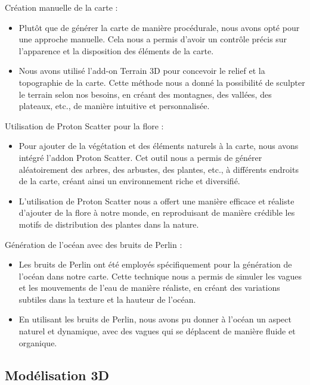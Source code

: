 \documentclass[
	article,			%
	11pt,				%
	oneside,			%
	a4paper,			%
	chapter=TITLE,
	french,			%
	sumario=tradicional
	]{base_nt}
\begin{document}
Création manuelle de la carte :

\begin{itemize}
    \item Plutôt que de générer la carte de manière procédurale, nous avons opté pour une approche manuelle. Cela nous a permis d'avoir un contrôle précis sur l'apparence et la disposition des éléments de la carte.
    \item Nous avons utilisé l'add-on Terrain 3D pour concevoir le relief et la topographie de la carte. Cette méthode nous a donné la possibilité de sculpter le terrain selon nos besoins, en créant des montagnes, des vallées, des plateaux, etc., de manière intuitive et personnalisée.
\end{itemize}

Utilisation de Proton Scatter pour la flore :

\begin{itemize}
    \item Pour ajouter de la végétation et des éléments naturels à la carte, nous avons intégré l'addon Proton Scatter. Cet outil nous a permis de générer aléatoirement des arbres, des arbustes, des plantes, etc., à différents endroits de la carte, créant ainsi un environnement riche et diversifié.
    \item L'utilisation de Proton Scatter nous a offert une manière efficace et réaliste d'ajouter de la flore à notre monde, en reproduisant de manière crédible les motifs de distribution des plantes dans la nature.
\end{itemize}

Génération de l'océan avec des bruits de Perlin :

\begin{itemize}
    \item Les bruits de Perlin ont été employés spécifiquement pour la génération de l'océan dans notre carte. Cette technique nous a permis de simuler les vagues et les mouvements de l'eau de manière réaliste, en créant des variations subtiles dans la texture et la hauteur de l'océan.
    \item En utilisant les bruits de Perlin, nous avons pu donner à l'océan un aspect naturel et dynamique, avec des vagues qui se déplacent de manière fluide et organique.
\end{itemize}

\subsection{Modélisation 3D}
\end{document}
